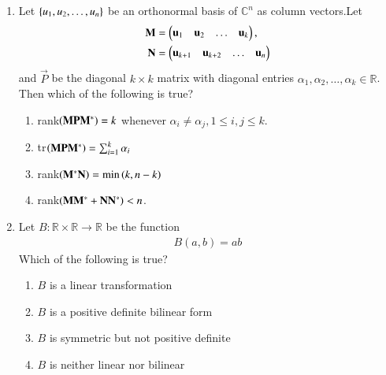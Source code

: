 \begin{enumerate}[label=\thesection.\arabic*.,ref=\thesection.\theenumi]
\begin{enumerate}
\end{enumerate}  
%
\item Let $\left\{u_1,u_2,\dots, u_n\right\}$ be an orthonormal basis of $\mathbb{C}^n$ as column vectors.Let 
\begin{align}
\mathbf{M} &= \begin{pmatrix}\mathbf{u}_1 & \mathbf{u}_2 & \dots & \mathbf{u}_k\end{pmatrix},
\\
\mathbf{N} &= \begin{pmatrix}\mathbf{u}_{k+1} & \mathbf{u}_{k+2} & \dots & \mathbf{u}_n\end{pmatrix}
\end{align}
%
and $\vec{P}$ be the diagonal $k \times k$ matrix with diagonal entries $\alpha_1,\alpha_2, \dots, \alpha_k \in \mathbb{R}$.  Then which of the following is true?
\begin{enumerate}
\item rank$\left(\mathbf{M}\mathbf{P}\mathbf{M}^*\right) = k$ whenever $\alpha_i \ne \alpha_j, 1 \le i, j \le k$.
\item tr$\left(\mathbf{M}\mathbf{P}\mathbf{M}^*\right) = \sum_{i=1}^{k}\alpha_i$
\item rank$\left(\mathbf{M}^*\mathbf{N}\right) = \min\left(k,n-k\right)$
\item rank$\left(\mathbf{M}\mathbf{M}^*+\mathbf{N}\mathbf{N}^*\right)  < n$.
\end{enumerate}  
%
\item Let $B: \mathbb{R} \times \mathbb{R} \to \mathbb{R}$ be the function
\begin{align}
B(a,b) = ab
\end{align}
Which of the following is true?
\begin{enumerate}
\item $B$ is a linear transformation
\item $B$ is a positive definite bilinear form
\item $B$ is symmetric but not positive definite
\item $B$ is neither linear nor bilinear
\end{enumerate}  

\end{enumerate}
